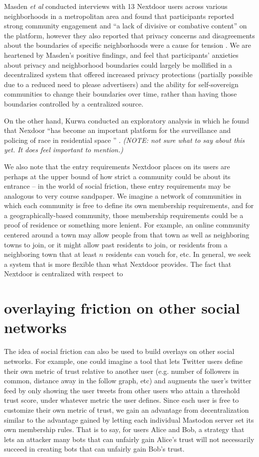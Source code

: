 \documentclass[sigconf,authordraft]{acmart}
\begin{document}
Masden {\itshape et al} conducted interviews with 13 Nextdoor users across various neighborhoods in a metropolitan area and found that participants reported strong community engagement and ``a lack of divisive or combative content'' on the platform, however they also reported that privacy concerns and disagreements about the boundaries of specific neighborhoods were a cause for tension \cite{masden2014tensions}. We are heartened by Masden's positive findings, and feel that participants' anxieties about privacy and neighborhood boundaries could largely be mollified in a decentralized system that offered increased privacy protections (partially possible due to a reduced need to please advertisers) and the ability for self-sovereign communities to change their boundaries over time, rather than having those boundaries controlled by a centralized source.

On the other hand, Kurwa conducted an exploratory analysis in which he found that Nexdoor ``has become an important platform for the surveillance and policing of race in residential space '' \cite{kurwa2019building}. \textit{(NOTE: not sure what to say about this yet. It does feel important to mention.)}

We also note that the entry requirements Nextdoor places on its users are perhaps at the upper bound of how strict a community could be about its entrance -- in the world of social friction, these entry requirements may be analogous to very course sandpaper. We imagine a network of communities in which each community is free to define its own membership requirements, and for a geographically-based community, those membership requirements could be a proof of residence or something more lenient. For example, an online community centered around a town may allow people from that town as well as neighboring towns to join, or it might allow past residents to join, or residents from a neighboring town that at least $n$ residents can vouch for, etc. In general, we seek a system that is more flexible than what Nextdoor provides. The fact that Nextdoor is centralized with respect to  

\section{overlaying friction on other social networks}

The idea of social friction can also be used to build overlays on other social networks. For example, one could imagine a tool that lets Twitter users define their own metric of trust relative to another user (e.g. number of followers in common, distance away in the follow graph, etc) and augments the user's twitter feed by only showing the user tweets from other users who attain a threshold trust score, under whatever metric the user defines. Since each user is free to customize their own metric of trust, we gain an advantage from decentralization similar to the advantage gained by letting each individual Mastodon server set its own membership rules. That is to say, for users Alice and Bob, a strategy that lets an attacker many bots that can unfairly gain Alice's trust will not necessarily succeed in creating bots that can unfairly gain Bob's trust.
\end{document}
